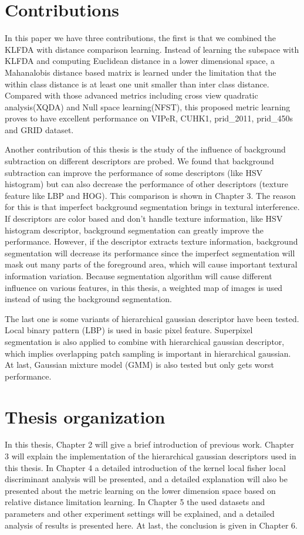 \section{Contributions}

In this paper we have three contributions, the first is that we combined the KLFDA with distance comparison learning. Instead of learning the subspace with KLFDA and computing Euclidean distance in a lower dimensional space, a Mahanalobis distance based matrix is learned under the limitation that the within class distance is at least one unit smaller than inter class distance. Compared with those advanced metrics including cross view quadratic analysis(XQDA) \cite{LOMO} and Null space learning(NFST), this proposed metric learning proves to have excellent performance on VIPeR, CUHK1, prid\_2011, prid\_450s and GRID dataset.

Another contribution of this thesis is the study of the influence of background subtraction on different descriptors are probed. We found that background subtraction can improve the performance of some descriptors (like HSV histogram) but can also decrease the performance of  other descriptors (texture feature like LBP and HOG). This comparison is shown in Chapter 3. The reason for this is that imperfect background segmentation brings in textural interference. If descriptors are color based and don't handle texture information, like HSV histogram descriptor, background segmentation can greatly improve the performance. However, if the descriptor extracts texture information, background segmentation will decrease its performance since the imperfect segmentation will mask out many parts of the foreground area, which will cause important textural information variation. Because segmentation algorithm will cause different influence on various features, in this thesis, a weighted map of images is used instead of using the background segmentation.

The last one is some variants of hierarchical gaussian descriptor have been tested. Local binary pattern (LBP) is used in basic pixel feature. Superpixel segmentation is also applied to combine with hierarchical gaussian descriptor, which implies overlapping patch sampling is important in hierarchical gaussian. At last, Gaussian mixture model (GMM) is also tested but only gets worst performance.

\section{Thesis organization}
In this thesis, Chapter 2 will give a brief introduction of previous work. Chapter 3 will explain the implementation of the hierarchical gaussian descriptors used in this thesis. In Chapter 4 a detailed introduction of the kernel local fisher local discriminant analysis will be presented, and a detailed explanation will also be presented about the metric learning on the lower dimension space based on relative distance limitation learning.
In Chapter 5 the used datasets and parameters and other experiment settings will be explained, and a detailed analysis of results is presented here. At last, the conclusion is given in Chapter 6.




